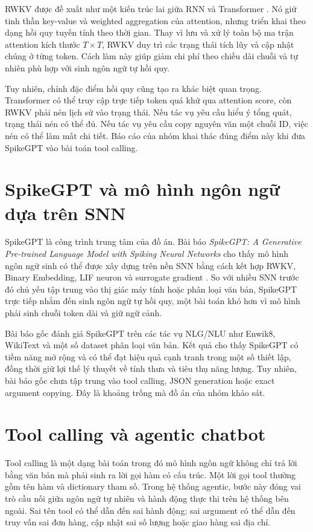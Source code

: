 \documentclass[12pt,a4paper,oneside]{report}
\newlength{\manualparindent}
\newcommand{\manualindent}{\hspace*{\manualparindent}}
\begin{document}
\manualindent%
RWKV được đề xuất như một kiến trúc lai giữa RNN và Transformer \cite{rwkv}. Nó giữ tinh thần key-value và weighted aggregation của attention, nhưng triển khai theo dạng hồi quy tuyến tính theo thời gian. Thay vì lưu và xử lý toàn bộ ma trận attention kích thước \(T\times T\), RWKV duy trì các trạng thái tích lũy và cập nhật chúng ở từng token. Cách làm này giúp giảm chi phí theo chiều dài chuỗi và tự nhiên phù hợp với sinh ngôn ngữ tự hồi quy.

\manualindent%
Tuy nhiên, chính đặc điểm hồi quy cũng tạo ra khác biệt quan trọng. Transformer có thể truy cập trực tiếp token quá khứ qua attention score, còn RWKV phải nén lịch sử vào trạng thái. Nếu tác vụ yêu cầu hiểu ý tổng quát, trạng thái nén có thể đủ. Nếu tác vụ yêu cầu copy nguyên văn một chuỗi ID, việc nén có thể làm mất chi tiết. Báo cáo của nhóm khai thác đúng điểm này khi đưa SpikeGPT vào bài toán tool calling.

\section{SpikeGPT và mô hình ngôn ngữ dựa trên SNN}

\manualindent%
SpikeGPT là công trình trung tâm của đồ án. Bài báo \textit{SpikeGPT: A Generative Pre-trained Language Model with Spiking Neural Networks} cho thấy mô hình ngôn ngữ sinh có thể được xây dựng trên nền SNN bằng cách kết hợp RWKV, Binary Embedding, LIF neuron và surrogate gradient \cite{spikegpt}. So với nhiều SNN trước đó chủ yếu tập trung vào thị giác máy tính hoặc phân loại văn bản, SpikeGPT trực tiếp nhắm đến sinh ngôn ngữ tự hồi quy, một bài toán khó hơn vì mô hình phải sinh chuỗi token dài và giữ ngữ cảnh.

\manualindent%
Bài báo gốc đánh giá SpikeGPT trên các tác vụ NLG/NLU như Enwik8, WikiText và một số dataset phân loại văn bản. Kết quả cho thấy SpikeGPT có tiềm năng mở rộng và có thể đạt hiệu quả cạnh tranh trong một số thiết lập, đồng thời giữ lợi thế lý thuyết về tính thưa và tiêu thụ năng lượng. Tuy nhiên, bài báo gốc chưa tập trung vào tool calling, JSON generation hoặc exact argument copying. Đây là khoảng trống mà đồ án của nhóm khảo sát.

\section{Tool calling và agentic chatbot}

\manualindent%
Tool calling là một dạng bài toán trong đó mô hình ngôn ngữ không chỉ trả lời bằng văn bản mà phải sinh ra lời gọi hàm có cấu trúc. Một lời gọi tool thường gồm tên hàm và dictionary tham số. Trong hệ thống agentic, bước này đóng vai trò cầu nối giữa ngôn ngữ tự nhiên và hành động thực thi trên hệ thống bên ngoài. Sai tên tool có thể dẫn đến sai hành động; sai argument có thể dẫn đến truy vấn sai đơn hàng, cập nhật sai số lượng hoặc giao hàng sai địa chỉ.
\end{document}
